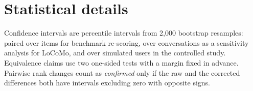 \section{Statistical details}
Confidence intervals are percentile intervals from 2{,}000 bootstrap resamples: paired over items for benchmark
re-scoring, over conversations as a sensitivity analysis for LoCoMo, and over simulated users in the controlled study.
Equivalence claims use two one-sided tests with a margin fixed in advance. Pairwise rank changes count as
\emph{confirmed} only if the raw and the corrected differences both have intervals excluding zero with opposite signs.
